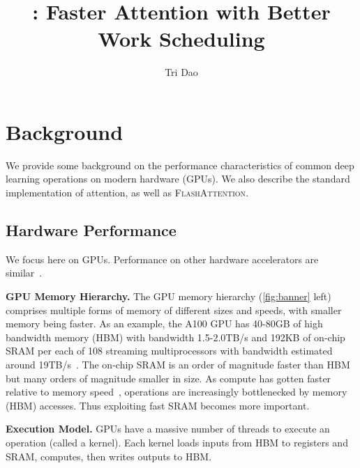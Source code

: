 \message{ !name(../flash2.tex)}\documentclass{article}
\title{\sysname: Faster Attention with Better Work Scheduling}
\author[$\dagger$]{Tri Dao}
\affil[$\dagger$]{Department of Computer Science, Princeton University}
\newcommand{\sysnameone}{\textsc{FlashAttention}\xspace}
\begin{document}
\section{Background}
\label{sec:background}

We provide some background on the performance characteristics of common deep
learning operations on modern hardware (GPUs).
We also describe the standard implementation of attention, as well as \sysnameone.

\subsection{Hardware Performance}
\label{subsec:hardware}

We focus here on GPUs.
Performance on other hardware accelerators are similar~\citep{jouppi2017datacenter, jia2019dissecting}.

\textbf{GPU Memory Hierarchy.}
The GPU memory hierarchy (\cref{fig:banner} left) comprises multiple forms of memory of different
sizes and speeds, with smaller memory being faster.
As an example, the A100 GPU has 40-80GB of high bandwidth memory (HBM) with
bandwidth 1.5-2.0TB/s and 192KB of on-chip SRAM per each of 108 streaming
multiprocessors with
bandwidth estimated around 19TB/s~\citep{jia2018dissecting, jia2021dissecting}.
The on-chip SRAM is an order of magnitude faster than HBM but many orders of
magnitude smaller in size.
As compute has gotten faster relative to memory speed~\citep{nvidia2017nvidia,nvidia2020nvidia,nvidia2022nvidia}, operations
are increasingly bottlenecked by memory (HBM) accesses.
Thus exploiting fast SRAM becomes more important.

\textbf{Execution Model.}
GPUs have a massive number of threads to execute an operation
(called a kernel).
Each kernel loads inputs from HBM to registers and SRAM, computes, then writes outputs to HBM.
\end{document}
